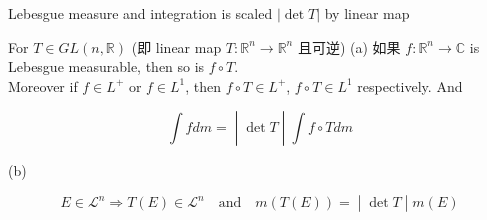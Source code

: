 \documentclass{qlnotes-export}
\begin{document}
\begin{theorem}{Lebesgue measure and integration is scaled \(|\det T|\) by linear map}\label{thm-07-lebesgue-measure-on-r-n-lebesgue-measure-and-integration-is-scaled-det-t-by-linear-map}

For \(T \in GL(n,{\mathbb{R}})\) (即 linear map \(T:{\mathbb{R}}^{n}\rightarrow{\mathbb{R}}^{n}\) 且可逆) (a) 如果 \(f:{\mathbb{R}}^{n}\rightarrow{\mathbb{C}}\) is Lebesgue measurable, then so is \(f \circ T\).\\
Moreover if \(f \in L^{+}\) or \(f \in L^{1}\), then \(f \circ T \in L^{+}\), \(f \circ T \in L^{1}\) respectively. And

\[\left. \int f dm = \middle| \det T \middle| \int f \circ T dm \right.\]

(b)

\[\left. E \in \mathcal{L}^{n}\Longrightarrow T(E) \in \mathcal{L}^{n}\quad\text{and}\quad m(T(E)) = \middle| \det T \middle| m(E) \right.\]

\end{theorem}
\end{document}
